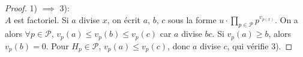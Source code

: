 \documentclass{article}
\theoremstyle{definition}
\theoremstyle{definition}
\theoremstyle{definition}
\theoremstyle{plain}
\theoremstyle{theorem}
\begin{document}
\begin{proof}

    1) $\implies$ 3):\\
    $A$ est factoriel. Si $a$  divise $x$, on écrit $a$, $b$, $c$ sous la forme $u \cdot \prod_{p \in \mathcal{P}} p^{v_{p(x)}}$.
    On a alors $\forall p \in \mathcal{P}$, $v_p(a) \leqslant v_p(b) \leqslant v_p(c)$ car $a$ divise $bc$.
    Si $v_p(a) \geqslant b$, alors $v_p(b) = 0$.
    Pour $H_p \in \mathcal{P}$, $v_p(a) \leqslant v_p(c)$, donc $a$ divise $c$, qui vérifie 3).

\end{proof}
\end{document}
